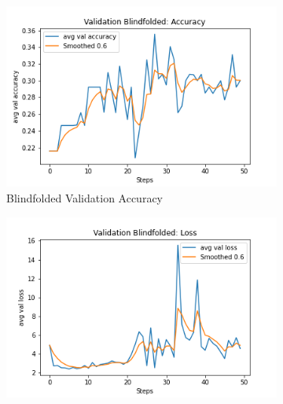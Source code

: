 \begin{figure}[ht!]
     \centering
     \begin{subfigure}[b]{0.3\textwidth}
         \centering
         \includegraphics[width=\textwidth]{./figure/results/baseline_and_blindfolding/blindfolded/avg val accuracy.png}
         \caption{Blindfolded Validation Accuracy}
         \label{fig:blindfolded_accuracy}
     \end{subfigure}
     \hfill
     \begin{subfigure}[b]{0.3\textwidth}
         \centering
         \includegraphics[width=\textwidth]{./figure/results/baseline_and_blindfolding/blindfolded/avg val loss.png}

\end{subfigure}
\end{figure}
